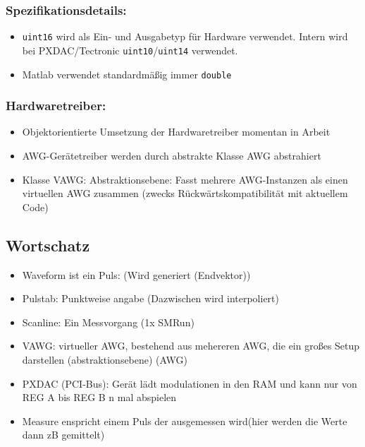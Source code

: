 \documentclass[DIN, pagenumber=false, fontsize=11pt]{scrartcl}
\begin{document}
\subsubsection{ Spezifikationsdetails:}
\begin{itemize}[noitemsep]
 \item \texttt{uint16} wird als Ein- und Ausgabetyp für Hardware verwendet. Intern wird bei PXDAC/Tectronic \texttt{uint10}/\texttt{uint14} verwendet.
 \item Matlab verwendet standardmäßig immer \texttt{double}
\end{itemize}

\subsubsection{ Hardwaretreiber: }
\begin{itemize}[noitemsep]
  \item Objektorientierte Umsetzung der Hardwaretreiber momentan in Arbeit
  \item AWG-Gerätetreiber werden durch abstrakte Klasse AWG abstrahiert
  \item Klasse VAWG: Abstraktionsebene: Fasst mehrere AWG-Instanzen als einen virtuellen AWG zusammen (zwecks Rückwärtskompatibilität mit aktuellem Code)
\end{itemize}

\subsection{ Wortschatz}
\begin{itemize}[noitemsep]
 \item Waveform ist ein Puls: (Wird generiert (Endvektor))
 \item Pulstab: Punktweise angabe (Dazwischen wird interpoliert)
 \item Scanline: Ein Messvorgang (1x SMRun)
 \item VAWG: virtueller AWG, bestehend aus mehereren AWG, die ein großes Setup darstellen (abstraktionsebene) (AWG)
 \item PXDAC (PCI-Bus): Gerät lädt modulationen in den RAM und kann nur von REG A bis REG B n mal abspielen
 \item Measure enspricht einem Puls der ausgemessen wird(hier werden die Werte dann zB gemittelt) 
\end{itemize}
\end{document}
